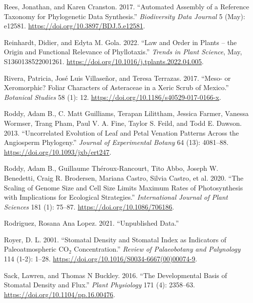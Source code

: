 \documentclass[
  12pt,
]{article}
\newlength{\cslhangindent}
\newlength{\cslentryspacingunit} %
\newenvironment{CSLReferences}[2] %
 {%
  \setlength{\parindent}{0pt}
  \ifodd #1
  \let\oldpar\par
  \def\par{\hangindent=\cslhangindent\oldpar}
  \fi
  \setlength{\parskip}{#2\cslentryspacingunit}
 }%
 {}
\begin{document}
\begin{CSLReferences}{1}{0}
\leavevmode{}%
Rees, Jonathan, and Karen Cranston. 2017. {``Automated Assembly of a Reference Taxonomy for Phylogenetic Data Synthesis.''} \emph{Biodiversity Data Journal} 5 (May): e12581. \url{https://doi.org/10.3897/BDJ.5.e12581}.

\leavevmode{}%
Reinhardt, Didier, and Edyta M. Gola. 2022. {``Law and Order in Plants -- the Origin and Functional Relevance of Phyllotaxis.''} \emph{Trends in Plant Science}, May, S1360138522001261. \url{https://doi.org/10.1016/j.tplants.2022.04.005}.

\leavevmode{}%
Rivera, Patricia, José Luis Villaseñor, and Teresa Terrazas. 2017. {``Meso- or Xeromorphic? {Foliar} Characters of {Asteraceae} in a Xeric Scrub of {Mexico}.''} \emph{Botanical Studies} 58 (1): 12. \url{https://doi.org/10.1186/s40529-017-0166-x}.

\leavevmode{}%
Roddy, Adam B., C. Matt Guilliams, Terapan Lilittham, Jessica Farmer, Vanessa Wormser, Trang Pham, Paul V. A. Fine, Taylor S. Feild, and Todd E. Dawson. 2013. {``Uncorrelated Evolution of Leaf and Petal Venation Patterns Across the Angiosperm Phylogeny.''} \emph{Journal of Experimental Botany} 64 (13): 4081--88. \url{https://doi.org/10.1093/jxb/ert247}.

\leavevmode{}%
Roddy, Adam B., Guillaume Théroux-Rancourt, Tito Abbo, Joseph W. Benedetti, Craig R. Brodersen, Mariana Castro, Silvia Castro, et al. 2020. {``The {Scaling} of {Genome} {Size} and {Cell} {Size} {Limits} {Maximum} {Rates} of {Photosynthesis} with {Implications} for {Ecological} {Strategies}.''} \emph{International Journal of Plant Sciences} 181 (1): 75--87. \url{https://doi.org/10.1086/706186}.

\leavevmode{}%
Rodriguez, Rosana Ana Lopez. 2021. {``Unpublished Data.''}

\leavevmode{}%
Royer, D. L. 2001. {``Stomatal Density and Stomatal Index as Indicators of Paleoatmospheric {CO}\(_{\textrm{2}}\) Concentration.''} \emph{Review of Palaeobotany and Palynology} 114 (1-2): 1--28. \url{https://doi.org/10.1016/S0034-6667(00)00074-9}.

\leavevmode{}%
Sack, Lawren, and Thomas N Buckley. 2016. {``The Developmental Basis of Stomatal Density and Flux.''} \emph{Plant Physiology} 171 (4): 2358--63. \url{https://doi.org/10.1104/pp.16.00476}.


\end{CSLReferences}
\end{document}
